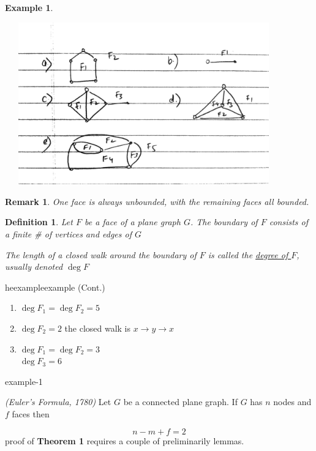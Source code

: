 \documentclass[12pt]{article}
\makeatletter
\newenvironment{theorem}[1]{%
  \renewcommand\themanualtheoreminner{#1}%
  \manualtheoreminner
}{\endmanualtheoreminner}
\newtheorem{example}{Example}
\newtheorem{definition}{Definition}
\newtheorem*{remark}{Remark}
\newenvironment{usecounterof}[2]{%
  \def\@tempb{#1}%
  \expandafter\renewcommand\csname the#1\endcsname{\ref{#2}}\@nameuse\@tempb}{%
    \@nameuse{end\@tempb}\addtocounter\@tempb{-1}}
\makeatother
\begin{document}
\begin{example}\label{a-thm}


	\begin{center}
		\includegraphics[width=12cm, height=7cm]{example2}
	\end{center}


\end{example}

\begin{remark}
	One face is always unbounded, with the remaining faces all bounded.
\end{remark}


\begin{definition}
	Let $F$ be a face of a plane graph $G$. The boundary of $F$ consists of a finite \# of vertices and edges of $G$

	The length of a closed walk around the boundary of $F$ is called the \underline{degree of $F$}, usually denoted $\deg F$

\end{definition}

\begin{usecounterof}{example}{a-thm} (Cont.)
	\begin{enumerate}
		\item $\deg F_{1} = \deg F_{2} = 5$
		\item $\deg F_{2} = 2$ the closed walk is $x\to y \to x$
		\item $\deg F_{1} = \deg F_{2} = 3$\\
		      $\deg F_{3} = 6$

	\end{enumerate}


\end{usecounterof}


\begin{theorem}{1}
	\textit{(Euler's Formula, 1780)} Let $G$ be a connected plane graph. If $G$ has $n$ nodes and $f$ faces then

	\[n - m + f = 2\]
	proof of \textbf{Theorem 1} requires a couple of preliminarily lemmas.
\end{theorem}
\end{document}
